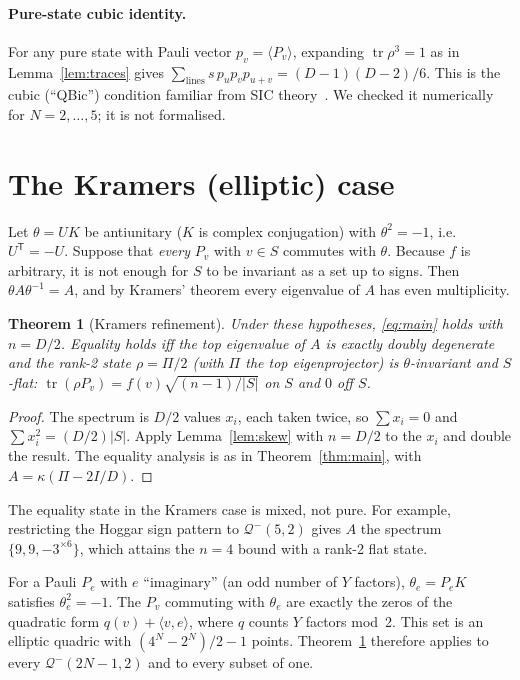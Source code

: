 \documentclass[aps,pra,onecolumn,11pt,superscriptaddress,nofootinbib]{revtex4-2}
\newtheorem{theorem}{Theorem}
\theoremstyle{definition}
\theoremstyle{remark}
\newcommand{\tr}{\operatorname{tr}}
\newcommand{\Qm}{\mathcal{Q}^{-}}
\begin{document}
\paragraph*{Pure-state cubic identity.}
For any pure state with Pauli vector $p_v=\langle P_v\rangle$, expanding $\tr\rho^3=1$ as in
Lemma~\ref{lem:traces} gives $\sum_{\text{lines}}s\,p_up_vp_{u+v}=(D-1)(D-2)/6$. This is the
cubic (``QBic'') condition familiar from SIC theory~\cite{Stacey2016}. We checked it
numerically for $N=2,\dots,5$; it is not formalised.

\section{The Kramers (elliptic) case}

Let $\theta=UK$ be antiunitary ($K$ is complex conjugation) with $\theta^2=-1$, i.e.\
$U^{\mathsf T}=-U$. Suppose that \emph{every} $P_v$ with $v\in S$ commutes with $\theta$.
Because $f$ is arbitrary, it is not enough for $S$ to be invariant as a set up to signs. Then
$\theta A\theta^{-1}=A$, and by Kramers' theorem every eigenvalue of $A$ has even
multiplicity.

\begin{theorem}[Kramers refinement]\label{thm:kramers}
Under these hypotheses, \eqref{eq:main} holds with $n=D/2$. Equality holds iff the top
eigenvalue of $A$ is exactly doubly degenerate and the rank-2 state $\rho=\Pi/2$ (with $\Pi$
the top eigenprojector) is $\theta$-invariant and $S$-flat:
$\tr(\rho P_v)=f(v)\sqrt{(n-1)/|S|}$ on $S$ and $0$ off $S$.
\end{theorem}
\begin{proof}
The spectrum is $D/2$ values $x_i$, each taken twice, so $\sum x_i=0$ and $\sum x_i^2=(D/2)|S|$.
Apply Lemma~\ref{lem:skew} with $n=D/2$ to the $x_i$ and double the result. The equality
analysis is as in Theorem~\ref{thm:main}, with $A=\kappa(\Pi-2I/D)$.
\end{proof}

The equality state in the Kramers case is mixed, not pure. For example, restricting the Hoggar
sign pattern to $\Qm(5,2)$ gives $A$ the spectrum $\{9,9,-3^{\times6}\}$, which attains the
$n=4$ bound with a rank-2 flat state.

For a Pauli $P_e$ with $e$ ``imaginary'' (an odd number of $Y$ factors), $\theta_e=P_eK$
satisfies $\theta_e^2=-1$. The $P_v$ commuting with $\theta_e$ are exactly the zeros of the
quadratic form $q(v)+\langle v,e\rangle$, where $q$ counts $Y$ factors mod~2. This set is an
elliptic quadric with $(4^N-2^N)/2-1$ points. Theorem~\ref{thm:kramers} therefore applies to
every $\Qm(2N-1,2)$ and to every subset of one.
\end{document}
